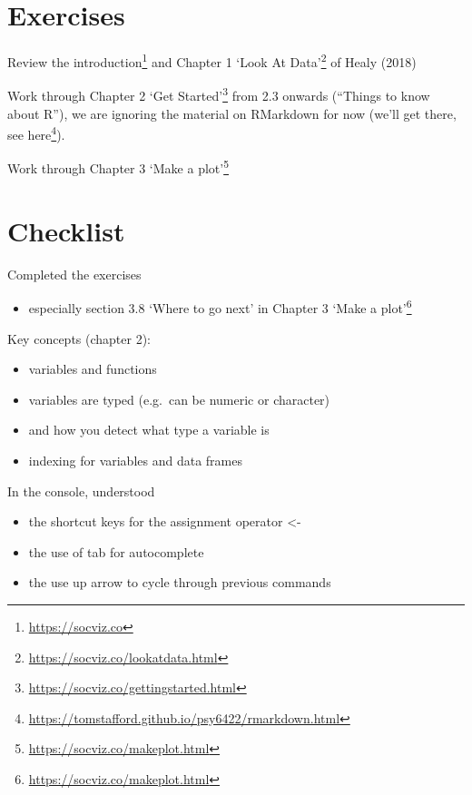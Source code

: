 \documentclass[
  12pt,
  a5paper,
]{book}
\DeclareRobustCommand{\href}[2]{#2\footnote{\url{#1}}}
\providecommand{\tightlist}{%
  \setlength{\itemsep}{0pt}\setlength{\parskip}{0pt}}
\begin{document}
\hypertarget{exercises}{%
\section{Exercises}\label{exercises}}

Review the \href{https://socviz.co}{introduction} and \href{https://socviz.co/lookatdata.html}{Chapter 1 `Look At Data'} of Healy (2018)

Work through \href{https://socviz.co/gettingstarted.html}{Chapter 2 `Get Started'} from 2.3 onwards (``Things to know about R''), we are ignoring the material on RMarkdown for now (we'll get there, see \href{https://tomstafford.github.io/psy6422/rmarkdown.html}{here}).

Work through \href{https://socviz.co/makeplot.html}{Chapter 3 `Make a plot'}

\hypertarget{checklist-1}{%
\section{Checklist}\label{checklist-1}}

Completed the exercises

\begin{itemize}
\tightlist
\item
  especially section 3.8 `Where to go next' in \href{https://socviz.co/makeplot.html}{Chapter 3 `Make a plot'}
\end{itemize}

Key concepts (chapter 2):

\begin{itemize}
\tightlist
\item
  variables and functions
\item
  variables are typed (e.g.~can be numeric or character)
\item
  and how you detect what type a variable is
\item
  indexing for variables and data frames
\end{itemize}

In the console, understood

\begin{itemize}
\tightlist
\item
  the shortcut keys for the assignment operator \textless-
\item
  the use of tab for autocomplete
\item
  the use up arrow to cycle through previous commands
\end{itemize}
\end{document}

